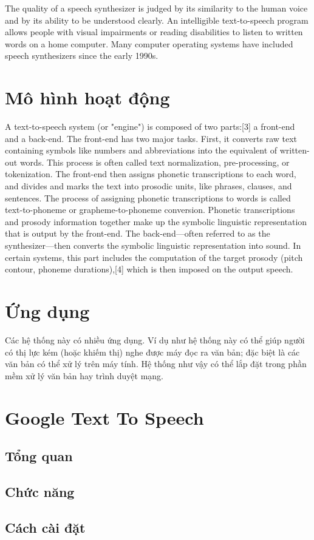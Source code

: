The quality of a speech synthesizer is judged by its similarity to the human voice and by its ability to be understood clearly. An intelligible text-to-speech program allows people with visual impairments or reading disabilities to listen to written words on a home computer. Many computer operating systems have included speech synthesizers since the early 1990s.
\section{Mô hình hoạt động}
A text-to-speech system (or "engine") is composed of two parts:[3] a front-end and a back-end. The front-end has two major tasks. First, it converts raw text containing symbols like numbers and abbreviations into the equivalent of written-out words. This process is often called text normalization, pre-processing, or tokenization. The front-end then assigns phonetic transcriptions to each word, and divides and marks the text into prosodic units, like phrases, clauses, and sentences. The process of assigning phonetic transcriptions to words is called text-to-phoneme or grapheme-to-phoneme conversion. Phonetic transcriptions and prosody information together make up the symbolic linguistic representation that is output by the front-end. The back-end—often referred to as the synthesizer—then converts the symbolic linguistic representation into sound. In certain systems, this part includes the computation of the target prosody (pitch contour, phoneme durations),[4] which is then imposed on the output speech.
\section{Ứng dụng}
Các hệ thống này có nhiều ứng dụng. Ví dụ như hệ thống này có thể giúp người có thị lực kém (hoặc khiếm thị) nghe được máy đọc ra văn bản; đặc biệt là các văn bản có thể xử lý trên máy tính. Hệ thống như vậy có thể lắp đặt trong phần mềm xử lý văn bản hay trình duyệt mạng.
\section{Google Text To Speech}
\subsection{Tổng quan}
\subsection{Chức năng}
\subsection{Cách cài đặt}
